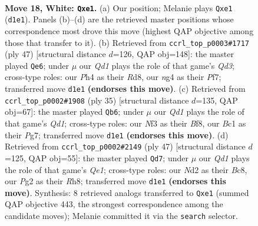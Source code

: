 \documentclass[11pt]{article}
\begin{document}
\clearpage

\begin{figure}[p]\centering
\begin{subfigure}{0.46\textwidth}\centering
\resizebox{\linewidth}{!}{%
\newchessgame
\chessboard[
  setfen={r1b2rk1/2p2p2/2B3p1/p3p2p/2P3nP/3q1N2/PP1N2P1/R1BQb2K w - - 0 18},
  showmover=false,
  pgfstyle=straightmove, color=movearrow, markmove={d1-e1}
]}
\caption{}
\end{subfigure}\hfill
\begin{subfigure}{0.46\textwidth}\centering
\resizebox{\linewidth}{!}{%
\newchessgame
\chessboard[
  setfen={3r2k1/p3bpp1/2Bq1n2/3n3p/Np1Q4/1P4P1/PB3P1P/2R3K1 b - - 1 24},
  showmover=false,
  pgfstyle=straightmove, color=movearrow, markmove={d6-e6}
]}
\caption{}
\end{subfigure}
\\[4pt]
\begin{subfigure}{0.46\textwidth}\centering
\resizebox{\linewidth}{!}{%
\newchessgame
\chessboard[
  setfen={3qkb1r/3p2pp/p4n2/npp2QB1/4P3/3P4/PPP2PPP/R3K2R b KQ - 2 18},
  showmover=false,
  pgfstyle=straightmove, color=movearrow, markmove={d8-b6}
]}
\caption{}
\end{subfigure}\hfill
\begin{subfigure}{0.46\textwidth}\centering
\resizebox{\linewidth}{!}{%
\newchessgame
\chessboard[
  setfen={Q1b1q2r/2p1n1bk/p1n4p/8/1p2NB2/3P4/PPP3PP/1K2RR2 b - - 0 24},
  showmover=false,
  pgfstyle=straightmove, color=movearrow, markmove={e8-d7}
]}
\caption{}
\end{subfigure}
\caption{\textbf{Move 18, White: \texttt{Qxe1}.} (a) Our position; Melanie plays \texttt{Qxe1} (\texttt{d1e1}). Panels (b)--(d) are the retrieved master positions whose correspondence most drove this move (highest QAP objective among those that transfer to it). (b) Retrieved from \texttt{ccrl\_top\_p0003\#1717} (ply 47) [structural distance $d$=126, QAP obj=148]: the master played \texttt{Qe6}; under $\mu$ our \emph{Qd1} plays the role of that game's \emph{Qd3}; cross-type roles: our \emph{P}h4 as their \emph{R}d8, our \emph{n}g4 as their \emph{P}f7; transferred move \texttt{d1e1} \textbf{(endorses this move)}. (c) Retrieved from \texttt{ccrl\_top\_p0002\#1908} (ply 35) [structural distance $d$=135, QAP obj=67]: the master played \texttt{Qb6}; under $\mu$ our \emph{Qd1} plays the role of that game's \emph{Qd1}; cross-type roles: our \emph{N}f3 as their \emph{B}f8, our \emph{B}c1 as their \emph{P}g7; transferred move \texttt{d1e1} \textbf{(endorses this move)}. (d) Retrieved from \texttt{ccrl\_top\_p0002\#2149} (ply 47) [structural distance $d$=125, QAP obj=55]: the master played \texttt{Qd7}; under $\mu$ our \emph{Qd1} plays the role of that game's \emph{Qe1}; cross-type roles: our \emph{N}d2 as their \emph{B}c8, our \emph{P}g2 as their \emph{R}h8; transferred move \texttt{d1e1} \textbf{(endorses this move)}. Synthesis: 8 retrieved analogs transferred to \texttt{Qxe1} (summed QAP objective 443, the strongest correspondence among the candidate moves); Melanie committed it via the \texttt{search} selector.}
\label{fig:thought-m34}
\end{figure}
\end{document}
